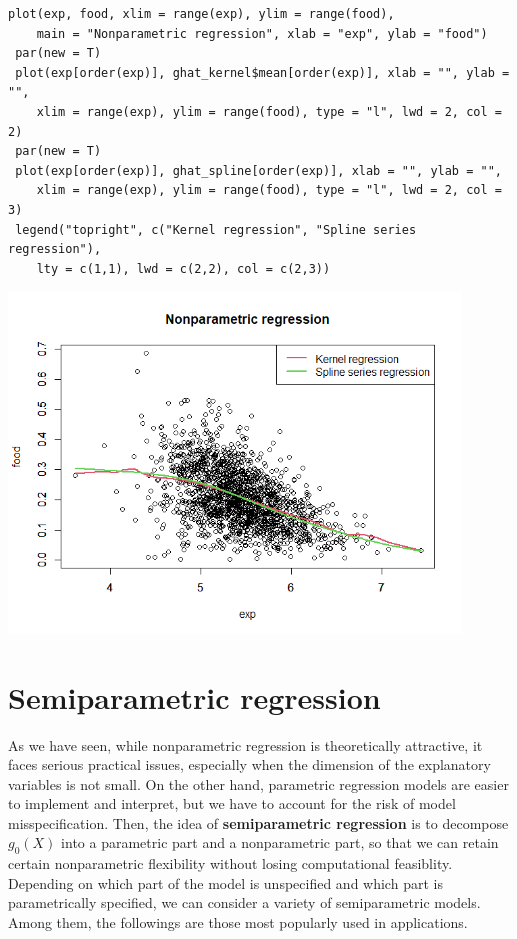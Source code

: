 \documentclass[10.5pt, A4paper, openany, uplatex]{book}
\numberwithin{equation}{section}
\begin{document}
\begin{lstlisting}[basicstyle=\ttfamily\footnotesize, frame=single]
 plot(exp, food, xlim = range(exp), ylim = range(food), 
	main = "Nonparametric regression", xlab = "exp", ylab = "food")
 par(new = T)
 plot(exp[order(exp)], ghat_kernel$mean[order(exp)], xlab = "", ylab = "",
	xlim = range(exp), ylim = range(food), type = "l", lwd = 2, col = 2)
 par(new = T)
 plot(exp[order(exp)], ghat_spline[order(exp)], xlab = "", ylab = "",
	xlim = range(exp), ylim = range(food), type = "l", lwd = 2, col = 3)
 legend("topright", c("Kernel regression", "Spline series regression"), 
	lty = c(1,1), lwd = c(2,2), col = c(2,3))
\end{lstlisting}

\begin{center}
	\includegraphics[width = 12cm]{engel.png}
\end{center}

\section{Semiparametric regression}

As we have seen, while nonparametric regression is theoretically attractive, it faces serious practical issues, especially when the dimension of the explanatory variables is not small.
On the other hand, parametric regression models are easier to implement and interpret, but we have to account for the risk of model misspecification.
Then, the idea of \textbf{semiparametric regression} is to decompose $g_0(X)$ into a parametric part and a nonparametric part, so that we can retain certain nonparametric flexibility without losing computational feasiblity.
Depending on which part of the model is unspecified and which part is parametrically specified, we can consider a variety of semiparametric models.
Among them, the followings are those most popularly used in applications.
\end{document}
